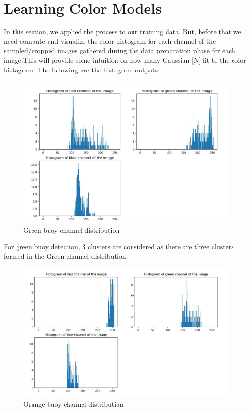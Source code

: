 \documentclass[12pt]{article}
\begin{document}
\section{Learning Color Models}
In this section, we applied the process to our training data. But, before that we need compute and visualize the color histogram for each channel of the sampled/cropped images gathered during the data preparation phase for each image.This will provide some intuition on how many Gaussian [N] ﬁt to the color histogram. The following are the histogram outputs:
\newpage
\begin{figure}[h]
    \centering
    \includegraphics[width=13cm]{greenbuoyhistogram}
    \caption{Green buoy channel distribution}
    \label{fig:Green buoy channel distribution}
\end{figure}
For green buoy detection, 3 clusters are considered as there are three clusters formed in the Green channel distribution.
\newline
\begin{figure}[h]
    \centering
    \includegraphics[width=13cm]{orangebuoyhistogram}
    \caption{Orange buoy channel distribution}
    \label{fig:Orange buoy channel distribution}
\end{figure}
\end{document}
